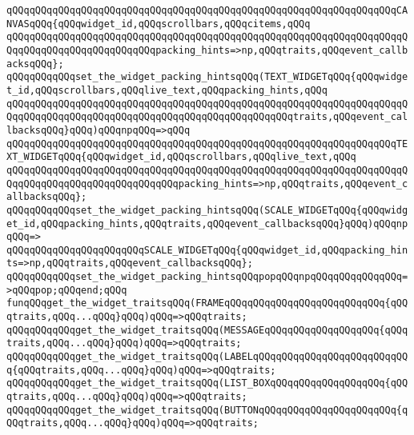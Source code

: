 \verb|qQQqqQQqqQQqqQQqqQQqqQQqqQQqqQQqqQQqqQQqqQQqqQQqqQQqqQQqqQQqqQQqqQQqCANVASqQQq{qQQqwidget_id,qQQqscrollbars,qQQqcitems,qQQq|\newline
\verb|qQQqqQQqqQQqqQQqqQQqqQQqqQQqqQQqqQQqqQQqqQQqqQQqqQQqqQQqqQQqqQQqqQQqqQQqqQQqqQQqqQQqqQQqqQQqqQQqpacking_hints=>np,qQQqtraits,qQQqevent_callbacksqQQq};|\newline
\verb|qQQqqQQqqQQqset_the_widget_packing_hintsqQQq(TEXT_WIDGETqQQq{qQQqwidget_id,qQQqscrollbars,qQQqlive_text,qQQqpacking_hints,qQQq|\newline
\verb|qQQqqQQqqQQqqQQqqQQqqQQqqQQqqQQqqQQqqQQqqQQqqQQqqQQqqQQqqQQqqQQqqQQqqQQqqQQqqQQqqQQqqQQqqQQqqQQqqQQqqQQqqQQqqQQqqQQqqQQqtraits,qQQqevent_callbacksqQQq}qQQq)qQQqnpqQQq=>qQQq|\newline
\verb|qQQqqQQqqQQqqQQqqQQqqQQqqQQqqQQqqQQqqQQqqQQqqQQqqQQqqQQqqQQqqQQqqQQqTEXT_WIDGETqQQq{qQQqwidget_id,qQQqscrollbars,qQQqlive_text,qQQq|\newline
\verb|qQQqqQQqqQQqqQQqqQQqqQQqqQQqqQQqqQQqqQQqqQQqqQQqqQQqqQQqqQQqqQQqqQQqqQQqqQQqqQQqqQQqqQQqqQQqqQQqqQQqpacking_hints=>np,qQQqtraits,qQQqevent_callbacksqQQq};|\newline
\verb|qQQqqQQqqQQqset_the_widget_packing_hintsqQQq(SCALE_WIDGETqQQq{qQQqwidget_id,qQQqpacking_hints,qQQqtraits,qQQqevent_callbacksqQQq}qQQq)qQQqnpqQQq=>|\newline
\verb|qQQqqQQqqQQqqQQqqQQqqQQqSCALE_WIDGETqQQq{qQQqwidget_id,qQQqpacking_hints=>np,qQQqtraits,qQQqevent_callbacksqQQq};|\newline
\verb|qQQqqQQqqQQqset_the_widget_packing_hintsqQQqpopqQQqnpqQQqqQQqqQQqqQQq=>qQQqpop;qQQqend;qQQq|\newline
\newline
\newline
\verb|funqQQqget_the_widget_traitsqQQq(FRAMEqQQqqQQqqQQqqQQqqQQqqQQqqQQq{qQQqtraits,qQQq...qQQq}qQQq)qQQq=>qQQqtraits;|\newline
\verb|qQQqqQQqqQQqget_the_widget_traitsqQQq(MESSAGEqQQqqQQqqQQqqQQqqQQq{qQQqtraits,qQQq...qQQq}qQQq)qQQq=>qQQqtraits;|\newline
\verb|qQQqqQQqqQQqget_the_widget_traitsqQQq(LABELqQQqqQQqqQQqqQQqqQQqqQQqqQQq{qQQqtraits,qQQq...qQQq}qQQq)qQQq=>qQQqtraits;|\newline
\verb|qQQqqQQqqQQqget_the_widget_traitsqQQq(LIST_BOXqQQqqQQqqQQqqQQqqQQq{qQQqtraits,qQQq...qQQq}qQQq)qQQq=>qQQqtraits;|\newline
\verb|qQQqqQQqqQQqget_the_widget_traitsqQQq(BUTTONqQQqqQQqqQQqqQQqqQQqqQQq{qQQqtraits,qQQq...qQQq}qQQq)qQQq=>qQQqtraits;|\newline
